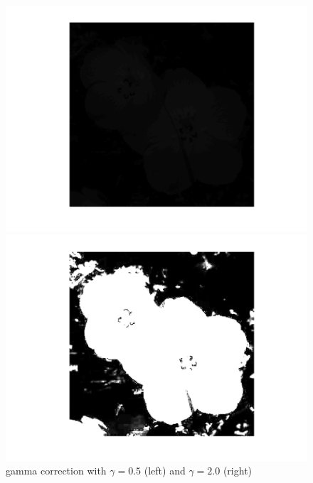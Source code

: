 \documentclass{scrartcl}
\begin{document}
%

\begin{figure}[htp!]
	\begin{minipage}[t]{0.5\textwidth}
		\includegraphics[width=\textwidth]{flower_g1.png}
	\end{minipage}
	\begin{minipage}[t]{0.5\textwidth}
		\includegraphics[width=\textwidth]{flower_g2.png}
	\end{minipage}
	\caption{gamma correction with $ \gamma = 0.5 $ (left) and $ \gamma = 2.0 $ (right)}
\end{figure}
\end{document}
